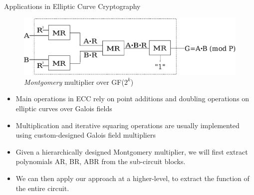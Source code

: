 \documentclass[xcolor=dvipsnames]{beamer}
\begin{document}
\begin{frame}{\large {Applications in Elliptic Curve Cryptography}}
\begin{figure}[hbt]
\centerline{
\includegraphics[scale=0.4]{new_mmcircuit.eps}
}
\caption{{\it Montgomery} multiplier over GF($2^k$)}
\label{fig:mm4}
\end{figure}
\begin{itemize}
\item Main operations in ECC rely on point additions and doubling operations
on elliptic curves over Galois fields
\item Multiplication and iterative squaring operations are usually implemented using custom-designed
Galois field multipliers
\item Given a hierarchically designed Montgomery multiplier, we will first extract polynomials AR, BR, ABR from the sub-circuit
blocks.
\item We can then apply our approach at a higher-level, to extract the function of the entire circuit.
\end{itemize}
\end{frame}
\end{document}
